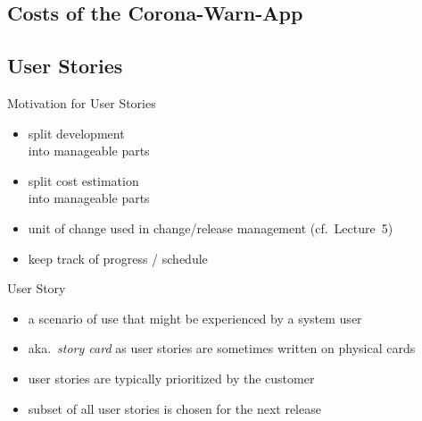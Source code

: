 \subsection{Costs of the Corona-Warn-App}
\begin{frame}{\insertsubsection{} }
	\centering{}
\end{frame}

\subsection{User Stories}
\begin{frame}{\insertsubsection}
	\begin{fancycolumns}
		\begin{note}{Motivation for User Stories}
			\begin{itemize}
				\item split development\\ into manageable parts
				\item split cost estimation\\ into manageable parts
				\item unit of change used in change/release management (cf.~Lecture~5)
				\item keep track of progress / schedule
			\end{itemize}
		\end{note}
		\nextcolumn
		\begin{definition}{User Story \mysource{\sommerville}}
			\begin{itemize}
				\item a scenario of use that might be experienced by a system user
				\item aka.\ \emph{story card} as user stories are sometimes written on physical cards
				\item user stories are typically prioritized by the customer
				\item subset of all user stories is chosen for the next release
			\end{itemize}
		\end{definition}
	\end{fancycolumns}
\end{frame}

